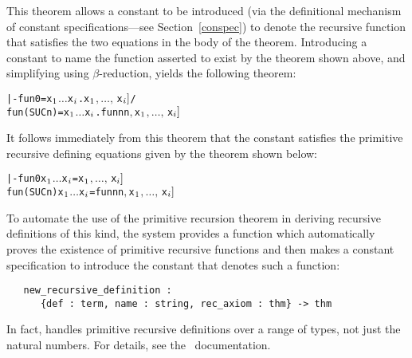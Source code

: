 \noindent This theorem allows a constant  to be introduced (via the
definitional mechanism of constant specifications---see Section~\ref{conspec})
to denote the recursive function that satisfies the two equations in the body
of the theorem. Introducing a constant  to name the function asserted
to exist by the theorem shown above, and simplifying using $\beta$-reduction,
yields the following theorem:

\begin{hol}
\begin{alltt}
   |- fun 0       = \bs{}x\(\sb{1}\) \(\dots\) x\(\sb{i}\).\m{f\sb{1}[}x\(\sb{1}\)\(,\ldots,\,\)x\(\sb{i}]\) /\bs{}
      fun (SUC n) = \bs{}x\(\sb{1}\) \(\dots\) x\(\sb{i}\).\m{f\sb{2}[}fun n  n\(,\) x\(\sb{1}\)\(,\ldots,\,\)x\(\sb{i}]\)
\end{alltt}
\end{hol}

\noindent It follows immediately from this theorem that the constant 
satisfies the primitive recursive defining equations given by the theorem shown
below:

\begin{hol}
\begin{alltt}
   |- fun 0 x\(\sb{1}\) \(\dots\) x\(\sb{i}\) = \m{f\sb{1}[}x\(\sb{1}\)\(,\ldots,\,\)x\(\sb{i}]\)
      fun (SUC n) x\(\sb{1}\) \(\dots\) x\(\sb{i}\) = \m{f\sb{2}[}fun n  n\(,\) x\(\sb{1}\)\(,\ldots,\,\)x\(\sb{i}]\)
\end{alltt}
\end{hol}

To automate the use of the primitive recursion theorem in deriving
recursive definitions of this kind, the \HOL{} system provides a function
which automatically proves the existence of primitive recursive
functions and then makes a constant specification to introduce the constant
that denotes such a function:

\begin{boxed}
\begin{verbatim}
   new_recursive_definition :
      {def : term, name : string, rec_axiom : thm} -> thm
\end{verbatim}
\end{boxed}

\noindent In fact,  handles
primitive recursive definitions over a range of types, not just the
natural numbers. For details, see the \REFERENCE\ documentation.

